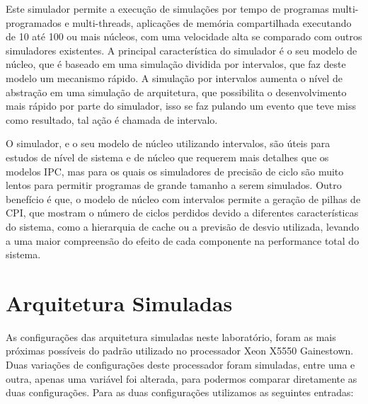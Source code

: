 \documentclass[12pt]{article}
\begin{document}
Este simulador permite a execução de simulações por tempo de programas multi-programados e multi-threads, aplicações de memória compartilhada executando de 10 até 100 ou mais núcleos, com uma velocidade alta se comparado com outros simuladores existentes. A principal característica do simulador é o seu modelo de núcleo, que é baseado em uma simulação dividida por intervalos, que faz deste modelo um mecanismo rápido. A simulação por intervalos aumenta o nível de abstração em uma simulação de arquitetura, que possibilita o desenvolvimento mais rápido por parte do simulador, isso se faz pulando um evento que teve miss como resultado, tal ação é chamada de intervalo. 

O simulador, e o seu modelo de núcleo utilizando intervalos, são úteis para estudos de nível de sistema e de núcleo que requerem mais detalhes que os modelos IPC, mas para os quais os simuladores de precisão de ciclo são muito lentos para permitir programas de grande tamanho a serem simulados. Outro benefício é que, o modelo de núcleo com intervalos permite a geração de pilhas de CPI, que mostram o número de ciclos perdidos devido a diferentes características do sistema, como a hierarquia de cache ou a previsão de desvio utilizada, levando a uma maior compreensão do efeito de cada componente na performance total do sistema.



\section{Arquitetura Simuladas}

As configurações das arquitetura simuladas neste laboratório, foram as mais próximas possíveis do padrão utilizado no processador Xeon X5550 Gainestown. Duas variações de configurações deste processador foram simuladas, entre uma e outra, apenas uma variável foi alterada, para podermos comparar diretamente as duas configurações. Para as duas configurações utilizamos as seguintes entradas: 
\end{document}
